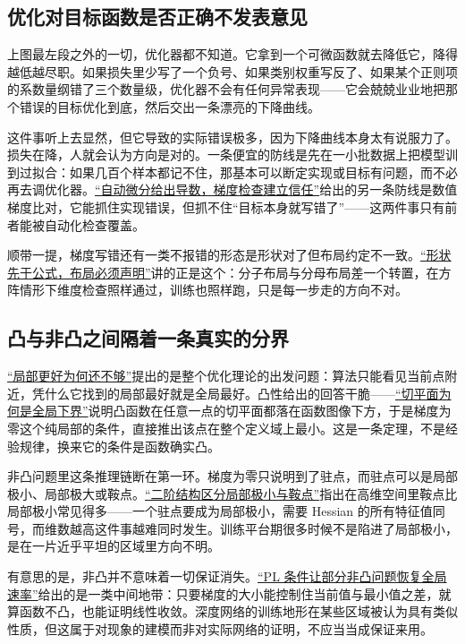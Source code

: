 \subsection{优化对目标函数是否正确不发表意见}

上图最左段之外的一切，优化器都不知道。它拿到一个可微函数就去降低它，降得越低越尽职。如果损失里少写了一个负号、如果类别权重写反了、如果某个正则项的系数量纲错了三个数量级，优化器不会有任何异常表现——它会兢兢业业地把那个错误的目标优化到底，然后交出一条漂亮的下降曲线。

这件事听上去显然，但它导致的实际错误极多，因为下降曲线本身太有说服力了。损失在降，人就会认为方向是对的。一条便宜的防线是先在一小批数据上把模型训到过拟合：如果几百个样本都记不住，那基本可以断定实现或目标有问题，而不必再去调优化器。\hyperref[sec:08-Numerical-Analysis/07-Numerical-Methods-for-ML/02]{``自动微分给出导数，梯度检查建立信任''}给出的另一条防线是数值梯度比对，它能抓住实现错误，但抓不住``目标本身就写错了''——这两件事只有前者能被自动化检查覆盖。

顺带一提，梯度写错还有一类不报错的形态是形状对了但布局约定不一致。\hyperref[sec:10-Matrix-Calculus/01-Derivative-Conventions/02]{``形状先于公式，布局必须声明''}讲的正是这个：分子布局与分母布局差一个转置，在方阵情形下维度检查照样通过，训练也照样跑，只是每一步走的方向不对。

\subsection{凸与非凸之间隔着一条真实的分界}

\hyperref[sec:09-Convex-Optimization/01-Optimization-Foundations/02]{``局部更好为何还不够''}提出的是整个优化理论的出发问题：算法只能看见当前点附近，凭什么它找到的局部最好就是全局最好。凸性给出的回答干脆——\hyperref[sec:09-Convex-Optimization/03-Convex-Functions/02]{``切平面为何是全局下界''}说明凸函数在任意一点的切平面都落在函数图像下方，于是梯度为零这个纯局部的条件，直接推出该点在整个定义域上最小。这是一条定理，不是经验规律，换来它的条件是函数确实凸。

非凸问题里这条推理链断在第一环。梯度为零只说明到了驻点，而驻点可以是局部极小、局部极大或鞍点。\hyperref[sec:09-Convex-Optimization/08-Nonconvex-and-Stochastic-Optimization/02]{``二阶结构区分局部极小与鞍点''}指出在高维空间里鞍点比局部极小常见得多——一个驻点要成为局部极小，需要 Hessian 的所有特征值同号，而维数越高这件事越难同时发生。训练平台期很多时候不是陷进了局部极小，是在一片近乎平坦的区域里方向不明。

有意思的是，非凸并不意味着一切保证消失。\hyperref[sec:09-Convex-Optimization/08-Nonconvex-and-Stochastic-Optimization/03]{``PL 条件让部分非凸问题恢复全局速率''}给出的是一类中间地带：只要梯度的大小能控制住当前值与最小值之差，就算函数不凸，也能证明线性收敛。深度网络的训练地形在某些区域被认为具有类似性质，但这属于对现象的建模而非对实际网络的证明，不应当当成保证来用。

